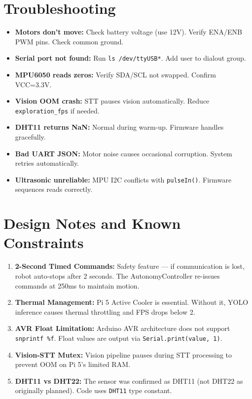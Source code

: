 \documentclass[11pt,a4paper]{article}
\begin{document}
\section{Troubleshooting}

\begin{itemize}
    \item \textbf{Motors don't move:} Check battery voltage (use 12V). Verify ENA/ENB PWM pins. Check common ground.
    \item \textbf{Serial port not found:} Run \texttt{ls /dev/ttyUSB*}. Add user to dialout group.
    \item \textbf{MPU6050 reads zeros:} Verify SDA/SCL not swapped. Confirm VCC=3.3V.
    \item \textbf{Vision OOM crash:} STT pauses vision automatically. Reduce \texttt{exploration\_fps} if needed.
    \item \textbf{DHT11 returns NaN:} Normal during warm-up. Firmware handles gracefully.
    \item \textbf{Bad UART JSON:} Motor noise causes occasional corruption. System retries automatically.
    \item \textbf{Ultrasonic unreliable:} MPU I2C conflicts with \texttt{pulseIn()}. Firmware sequences reads correctly.
\end{itemize}

\section{Design Notes and Known Constraints}

\begin{enumerate}
    \item \textbf{2-Second Timed Commands:} Safety feature --- if communication is lost, robot auto-stops after 2 seconds. The AutonomyController re-issues commands at 250ms to maintain motion.
    \item \textbf{Thermal Management:} Pi 5 Active Cooler is essential. Without it, YOLO inference causes thermal throttling and FPS drops below 2.
    \item \textbf{AVR Float Limitation:} Arduino AVR architecture does not support \texttt{snprintf \%f}. Float values are output via \texttt{Serial.print(value, 1)}.
    \item \textbf{Vision-STT Mutex:} Vision pipeline pauses during STT processing to prevent OOM on Pi 5's limited RAM.
    \item \textbf{DHT11 vs DHT22:} The sensor was confirmed as DHT11 (not DHT22 as originally planned). Code uses \texttt{DHT11} type constant.
\end{enumerate}
\end{document}

